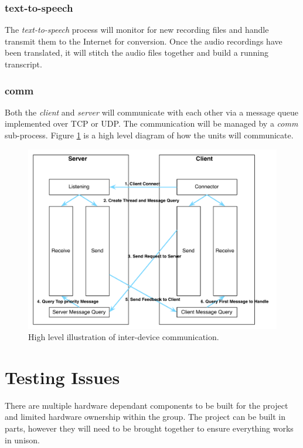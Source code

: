 \documentclass[11pt,a4paper,titlepage]{report}
\begin{document}
\subsubsection{text-to-speech}

The \textit{text-to-speech} process will monitor for new recording files and handle transmit them to the Internet for conversion. Once the audio recordings have been translated, it will stitch the audio files together and build a running transcript.


\subsubsection{comm}

Both the \textit{client} and \textit{server} will communicate with each other via a message queue implemented over TCP or UDP. The communication will be managed by a \textit{comm} sub-process. Figure \ref{fig:comm} is a high level diagram of how the units will communicate.

\begin{figure}
\centering
\includegraphics[width=1.0\textwidth]{graphs/comm.pdf}
\caption{High level illustration of inter-device communication.}
\label{fig:comm}
\end{figure}


\section{Testing Issues}

There are multiple hardware dependant components to be built for the project and limited hardware ownership within the group. The project can be built in parts, however they will need to be brought together to ensure everything works in unison. 
\end{document}
